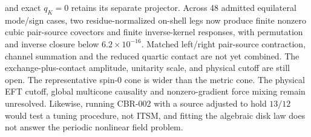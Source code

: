 and exact $q_K=0$ retains its separate projector.  Across 48 admitted
equilateral mode/sign cases, two residue-normalized on-shell legs now produce
finite nonzero cubic pair-source covectors and finite inverse-kernel
responses, with permutation and inverse closure below $6.2\times10^{-16}$.
Matched left/right pair-source contraction, channel summation and the reduced
quartic contact are not yet combined.  The exchange-plus-contact amplitude,
unitarity scale, and physical cutoff are still open.  The
representative spin-0 cone is wider than the metric cone.
The physical EFT cutoff, global multicone causality
and nonzero-gradient force mixing remain unresolved.
Likewise, running CBR-002 with a source adjusted to hold $13/12$ would test a
tuning procedure, not ITSM, and fitting the algebraic disk law does not answer
the periodic nonlinear field problem.
